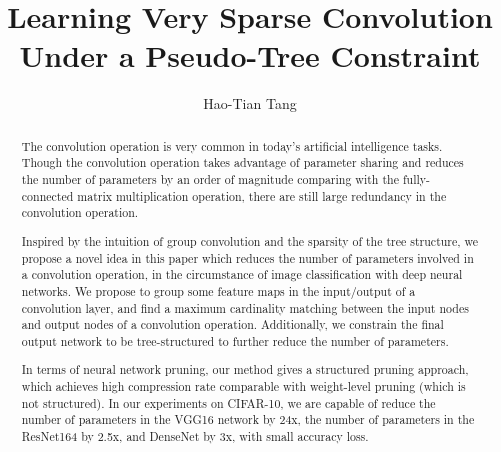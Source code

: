 \documentclass{acmtog} %
\begin{document}

\title{Learning Very Sparse Convolution Under a Pseudo-Tree Constraint} %

\author{Hao-Tian Tang
}






\maketitle



\begin{abstract}
The convolution operation is very common in today's artificial intelligence tasks. Though the convolution operation takes advantage of parameter sharing and reduces the number of parameters by an order of magnitude comparing with the fully-connected matrix multiplication operation, there are still large redundancy in the convolution operation.

Inspired by the intuition of group convolution and the sparsity of the tree structure, we propose a novel idea in this paper which reduces the number of parameters involved in a convolution operation, in the circumstance of image classification with deep neural networks. We propose to group some feature maps in the input/output of a convolution layer, and find a maximum cardinality matching between the input nodes and output nodes of a convolution operation. Additionally, we constrain the final output network to be tree-structured to further reduce the number of parameters.

In terms of neural network pruning, our method gives a structured pruning approach, which achieves high compression rate comparable with weight-level pruning (which is not structured). In our experiments on CIFAR-10, we are capable of reduce the number of parameters in the VGG16 network by 24x, the number of parameters in the ResNet164 by 2.5x, and DenseNet by 3x, with small accuracy loss.
\end{abstract}
\end{document}
